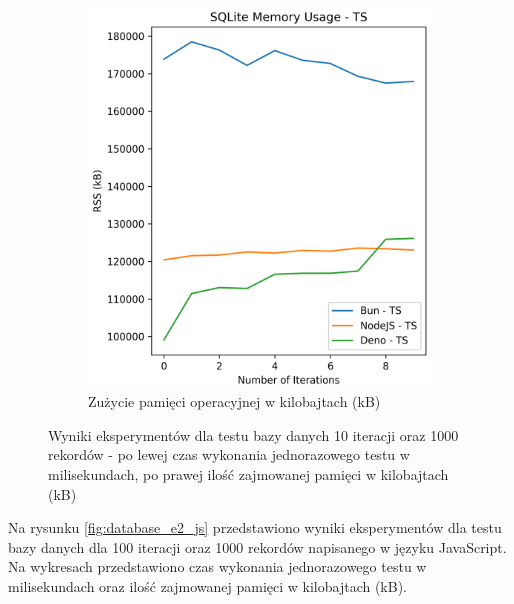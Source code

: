 \begin{figure}[H]
\begin{subfigure}[b]{0.42\textwidth}
    \centering
    \includegraphics[width=\textwidth]{Figures/database/sqlite_10_1000_ts_memory.png}
    \caption{Zużycie pamięci operacyjnej w kilobajtach (kB)}
    \label{fig:database_e1_ts_memory}
  \end{subfigure}
  \caption{Wyniki eksperymentów dla testu bazy danych 10 iteracji oraz 1000 rekordów - po lewej czas wykonania jednorazowego testu w milisekundach, po prawej ilość zajmowanej pamięci w kilobajtach (kB)}
  \label{fig:database_e1_ts}
\end{figure}

Na rysunku \ref{fig:database_e2_js} przedstawiono wyniki eksperymentów dla testu bazy danych dla 100 iteracji oraz 1000 rekordów napisanego w języku JavaScript. Na wykresach przedstawiono czas wykonania jednorazowego testu w milisekundach oraz ilość zajmowanej pamięci w kilobajtach (kB).

